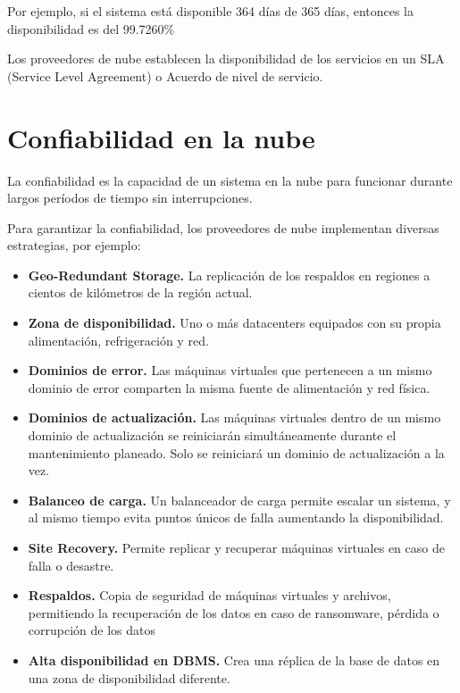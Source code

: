 Por ejemplo, si el sistema está disponible 364 días de 365 días, entonces la disponibilidad es del 99.7260\%

Los proveedores de nube establecen la disponibilidad de los servicios en un SLA (Service Level Agreement) o Acuerdo de nivel de servicio.

\section{Confiabilidad en la nube}

La confiabilidad es la capacidad de un sistema en la nube para funcionar durante largos períodos de tiempo sin interrupciones.

Para garantizar la confiabilidad, los proveedores de nube implementan diversas estrategias, por ejemplo:

\begin{itemize}

\item \textbf{Geo-Redundant Storage.} La replicación de los respaldos en regiones a cientos de kilómetros de la región actual.

\item \textbf{Zona de disponibilidad.} Uno o más datacenters equipados con su propia alimentación, refrigeración y red.

\item \textbf{Dominios de error.} Las máquinas virtuales que pertenecen a un mismo dominio de error comparten la misma fuente de alimentación y red física.

\item \textbf{Dominios de actualización.} Las máquinas virtuales dentro de un mismo dominio de actualización se reiniciarán simultáneamente durante el mantenimiento planeado. Solo se reiniciará un dominio de actualización a la vez.

\item \textbf{Balanceo de carga.} Un balanceador de carga permite escalar un sistema, y al mismo tiempo evita puntos únicos de falla aumentando la disponibilidad.

\item \textbf{Site Recovery.} Permite replicar y recuperar máquinas virtuales en caso de falla o desastre.

\item \textbf{Respaldos.} Copia de seguridad de máquinas virtuales y archivos, permitiendo la recuperación de los datos en caso de ransomware, pérdida o corrupción de los datos

\item \textbf{Alta disponibilidad en DBMS.} Crea una réplica de la base de datos en una zona de disponibilidad diferente.

\end{itemize}


